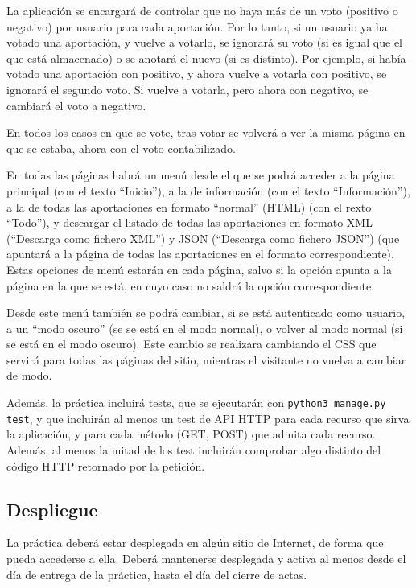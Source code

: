 La aplicación se encargará de controlar que no haya más de un voto (positivo o negativo) por usuario para cada aportación. Por lo tanto, si un usuario ya ha votado una aportación, y vuelve a votarlo, se ignorará su voto (si es igual que el que está almacenado) o se anotará el nuevo (si es distinto). Por ejemplo, si había votado una aportación con positivo, y ahora vuelve a votarla con positivo, se ignorará el segundo voto. Si vuelve a votarla, pero ahora con negativo, se cambiará el voto a negativo.

En todos los casos en que se vote, tras votar se volverá a ver la misma página en que se estaba, ahora con el voto contabilizado.

En todas las páginas habrá un menú desde el que se podrá acceder a la página principal (con el texto ``Inicio''), a la de información (con el texto ``Información''), a la de todas las aportaciones en formato ``normal'' (HTML) (con el rexto ``Todo''), y descargar el listado de todas las aportaciones en formato XML (``Descarga como fichero XML'') y JSON (``Descarga como fichero JSON'') (que apuntará a la página de todas las aportaciones en el formato correspondiente). Estas opciones de menú estarán en cada página, salvo si la opción apunta a la página en la que se está, en cuyo caso no saldrá la opción correspondiente.

Desde este menú también se podrá cambiar, si se está autenticado como usuario, a un ``modo oscuro'' (se se está en el modo normal), o volver al modo normal (si se está en el modo oscuro). Este cambio se realizara cambiando el CSS que servirá para todas las páginas del sitio, mientras el visitante no vuelva a cambiar de modo.

Además, la práctica incluirá tests, que se ejecutarán con \verb|python3 manage.py test|, y que incluirán al menos un test de API HTTP para cada recurso que sirva la aplicación, y para cada método (GET, POST) que admita cada recurso. Además, al menos la mitad de los test incluirán comprobar algo distinto del código HTTP retornado por la petición.

\subsection{Despliegue}
\label{sec:practica-2021-05:despliegue}

La práctica deberá estar desplegada en algún sitio de Internet, de forma que pueda accederse a ella. Deberá mantenerse desplegada y activa al menos desde el día de entrega de la práctica, hasta el día del cierre de actas.


